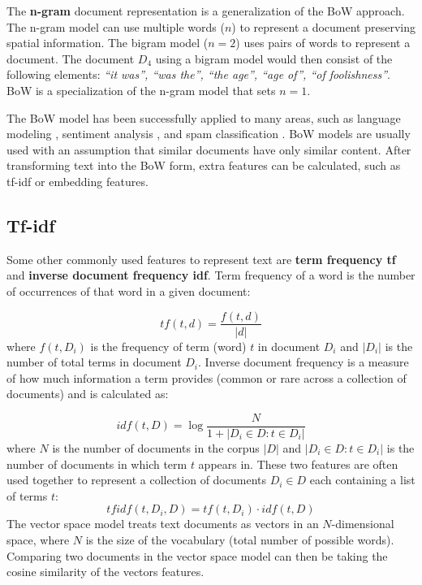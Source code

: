 The \textbf{n-gram} document representation is a generalization of the BoW
approach. The n-gram model
can use multiple words ($n$) to represent a document preserving spatial information.
The bigram model ($n = 2$) uses pairs of words to represent a document.
The document $D_4$ using a bigram model would then consist of the following 
elements:
\emph{``it was'', ``was the'', ``the age'', ``age of'', ``of foolishness''}.
BoW is a specialization of the n-gram model
that sets $n=1$. 

The BoW model has been successfully applied to many areas, such as language
modeling \citep{tirilly2008language}, sentiment analysis
\citep{wang2014microblog}, and spam classification \citep{kolari2006detecting}.
BoW models are
usually used with an assumption that similar documents have only similar
content. After transforming text into the BoW form, extra features can be
calculated, such as tf-idf or embedding features. 

\subsection{Tf-idf}
\label{sec:tf-idf}
Some other commonly used features  to represent text are \textbf{term frequency
tf} and \textbf{inverse document frequency idf}. Term frequency of a word is
the number of occurrences of that word in a given document:

$$
\mathit{tf}(t, d) = \frac{f(t, d)}{|d|}
$$
where $f(t, D_i)$ is the frequency of term (word) $t$ in document $D_i$ and $|D_i|$ is the number
of total terms in document $D_i$.
Inverse document frequency is a measure of how much information a term provides (common or rare
across a collection of documents) and is calculated as:

\begin{equation}
	\label{eq:idf}
\mathit{idf}(t, D) = \log \frac{N}{1 + |D_i \in D: t \in D_i|}
\end{equation}
where $N$ is the number of documents in the corpus $|D|$ and $|D_i \in D: t \in D_i|$ is the 
number of documents in which term $t$ appears in. 
These two features are often used together to represent a collection of documents 
$D_i \in D$ each containing a list of terms $t$:
$$
\mathit{tfidf} (t, D_i, D) = \mathit{tf}(t, D_i) \cdot \mathit{idf}(t, D)
$$
The vector space model \citep{meadow1992text} treats text documents as vectors  
in an $N$-dimensional space, where $N$ is the size of the vocabulary (total number of 
possible words). Comparing two documents in the vector space model can then be taking the
cosine similarity of the vectors features.

